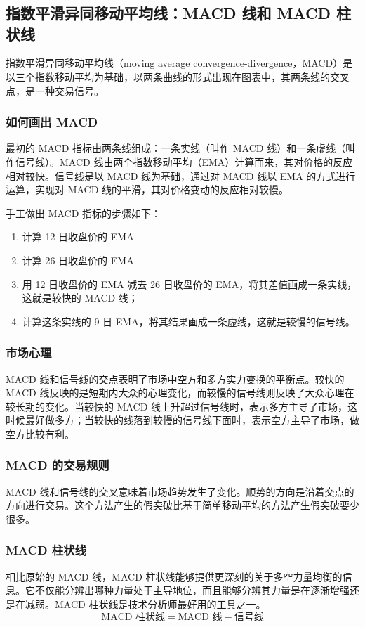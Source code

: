 \chapter{}
\section{指数平滑异同移动平均线：MACD 线和 MACD 柱状线}
指数平滑异同移动平均线（moving average convergence-divergence，MACD）是以三个指数移动平均为基础，以两条曲线的形式出现在图表中，其两条线的交叉点，是一种交易信号。
\subsection{如何画出 MACD}
最初的 MACD 指标由两条线组成：一条实线（叫作 MACD 线）和一条虚线（叫作信号线）。MACD 线由两个指数移动平均（EMA）计算而来，其对价格的反应相对较快。信号线是以 MACD 线为基础，通过对 MACD 线以 EMA 的方式进行运算，实现对 MACD 线的平滑，其对价格变动的反应相对较慢。

手工做出 MACD 指标的步骤如下：
\begin{enumerate}
    \item 计算 12 日收盘价的 EMA
    \item 计算 26 日收盘价的 EMA
    \item 用 12 日收盘价的 EMA 减去 26 日收盘价的 EMA，将其差值画成一条实线，这就是较快的 MACD 线；
    \item 计算这条实线的 9 日 EMA，将其结果画成一条虚线，这就是较慢的信号线。
\end{enumerate}
\subsection*{市场心理}
MACD 线和信号线的交点表明了市场中空方和多方实力变换的平衡点。较快的 MACD 线反映的是短期内大众的心理变化，而较慢的信号线则反映了大众心理在较长期的变化。当较快的 MACD 线上升超过信号线时，表示多方主导了市场，这时候最好做多方；当较快的线落到较慢的信号线下面时，表示空方主导了市场，做空方比较有利。
\subsection*{MACD 的交易规则}
MACD 线和信号线的交叉意味着市场趋势发生了变化。顺势的方向是沿着交点的方向进行交易。这个方法产生的假突破比基于简单移动平均的方法产生假突破要少很多。

\subsection{MACD 柱状线}
相比原始的 MACD 线，MACD 柱状线能够提供更深刻的关于多空力量均衡的信息。它不仅能分辨出哪种力量处于主导地位，而且能够分辨其力量是在逐渐增强还是在减弱。MACD 柱状线是技术分析师最好用的工具之一。
\begin{equation}
    \text{MACD 柱状线}=\text{MACD 线}-\text{信号线}
\end{equation}

